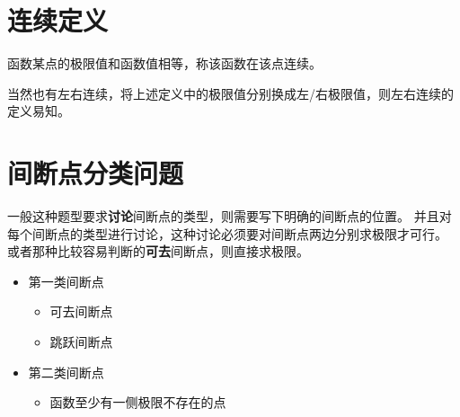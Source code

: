 \section{连续定义}

\begin{definition}
	函数某点的极限值和函数值相等，称该函数在该点连续。
\end{definition}
当然也有左右连续，将上述定义中的极限值分别换成左/右极限值，则左右连续的定义易知。

\section{间断点分类问题}
一般这种题型要求\textbf{讨论}间断点的类型，则需要写下明确的间断点的位置。
并且对每个间断点的类型进行讨论，这种讨论必须要对间断点两边分别求极限才可行。
或者那种比较容易判断的\textbf{可去}间断点，则直接求极限。

\begin{itemize}
    \item 第一类间断点
        \begin{itemize} 
            \item 可去间断点
            \item 跳跃间断点
        \end{itemize}
    \item 第二类间断点
        \begin{itemize}
            \item 函数至少有一侧极限不存在的点
        \end{itemize}
\end{itemize}
